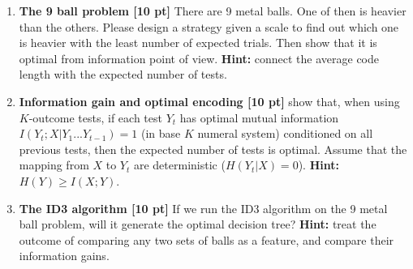 \documentclass[11pt]{article}
\begin{document}
\begin{enumerate}

\item
\textbf{The 9 ball problem [10 pt]} There are 9 metal balls. One of then is
heavier than the others. Please design a strategy given a scale to find out
which one is heavier with the least number of expected trials. Then show that
it is optimal from information point of view. \textbf{Hint:} connect the
average code length with the expected number of tests.

\item
\textbf{Information gain and optimal encoding [10 pt]} show that, when using
$K$-outcome tests, if each test $Y_t$ has optimal mutual information
$I(Y_t;X|Y_1 ...Y_{t-1})=1$ (in base $K$ numeral system) conditioned on all
previous tests, then the expected number of tests is optimal. Assume that the
mapping from $X$ to $Y_t$ are deterministic ($H(Y_t|X)=0$). \textbf{Hint:}
$H(Y) \geq I(X;Y)$.

\item
\textbf{The ID3 algorithm [10 pt]} If we run the ID3 algorithm on the 9 metal
ball problem, will it generate the optimal decision tree? \textbf{Hint:} treat
the outcome of comparing any two sets of balls as a feature, and compare their
information gains.



\end{enumerate}
\end{document}

